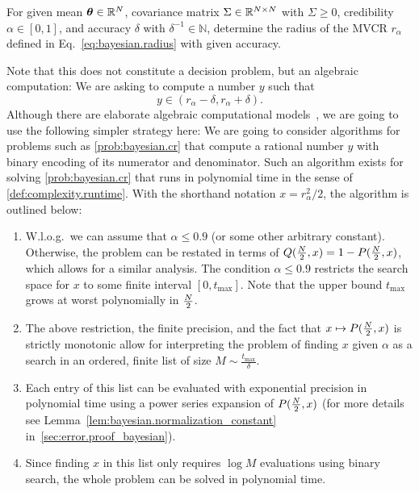 \begin{problem}\label{prob:bayesian.cr}
  For given mean ${\boldsymbol{\theta}} \in \mathbb{R}^N$, covariance matrix $\Sigma \in \mathbb{R}^{N \times N}$ with $\Sigma \geq 0$, credibility $\alpha \in [0,1]$, and accuracy $\delta$ with $\delta^{-1} \in \mathbb{N}$, determine the radius of the MVCR $r_{\alpha}$ defined in Eq.~\eqref{eq:bayesian.radius} with given accuracy.
\end{problem}
Note that this does not constitute a decision problem, but an algebraic computation:
We are asking to compute a number $y$ such that
\[
  \label{eq:bayesian.precission}
  y \in (r_\alpha - \delta, r_\alpha + \delta).
\]
Although there are elaborate algebraic computational models~\cite[Sec.\ 16]{Arora_2009_Computational}, we are going to use the following simpler strategy here:
We are going to consider algorithms for problems such as \cref{prob:bayesian.cr} that compute a rational number $y$ with binary encoding of its numerator and denominator.
Such an algorithm exists for solving \cref{prob:bayesian.cr} that runs in polynomial time in the sense of \cref{def:complexity.runtime}.
With the shorthand notation $x = r^2_{\alpha}/2$, the algorithm is outlined below:
\begin{enumerate}
  \item W.l.o.g.\ we can assume that $\alpha \le 0.9$ (or some other arbitrary constant).
  Otherwise, the problem can be restated in terms of $Q(\tfrac{N}{2}, x) = 1 - P(\tfrac{N}{2}, x)$, which allows for a similar analysis.
  The condition $\alpha \le 0.9$ restricts the search space for $x$ to some finite interval $[0, t_\mathrm{max}]$.
  Note that the upper bound $t_\mathrm{max}$ grows at worst polynomially in $\tfrac{N}{2}$.
  \item The above restriction, the finite precision, and the fact that $x \mapsto P(\tfrac{N}{2}, x)$ is strictly monotonic allow for interpreting the problem of finding $x$ given $\alpha$ as a search in an ordered, finite list of size $M \sim \tfrac{t_\mathrm{max}}{\delta}$.
  \item Each entry of this list can be evaluated with exponential precision in polynomial time using a power series expansion of $P(\tfrac{N}{2}, x)$ (for more details see Lemma~\ref{lem:bayesian.normalization_constant} in~\ref{sec:error.proof_bayesian}).
  \item Since finding $x$ in this list only requires $\log M$ evaluations using binary search, the whole problem can be solved in polynomial time.
\end{enumerate}


